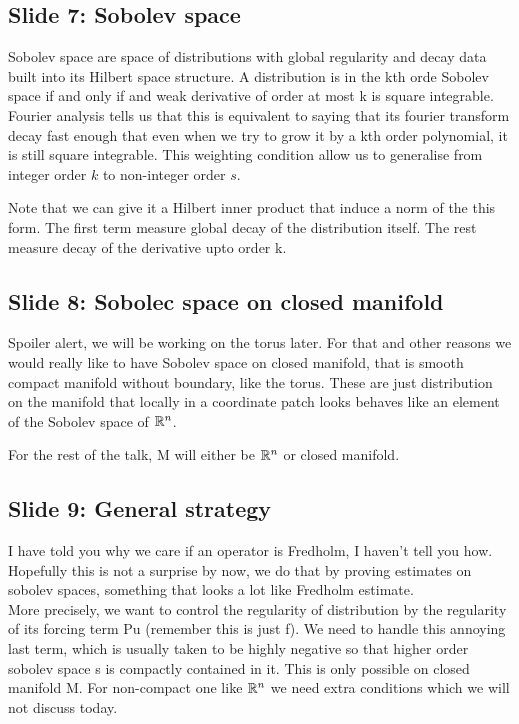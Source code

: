 \documentclass{article}
\begin{document}
\subsection{Slide 7: Sobolev space}
Sobolev space are space of distributions with global regularity and decay data built into its Hilbert space structure. A distribution is in the kth orde Sobolev space if and only if and weak derivative of order at most k is square integrable. Fourier analysis tells us that this is equivalent to saying that its fourier transform decay fast enough that even when we try to grow it by a kth order polynomial, it is still square integrable. This weighting condition allow us to generalise from integer order $k$ to non-integer order $s$. 

Note that we can give it a Hilbert inner product that induce a norm of the this form. The first term measure global decay of the distribution itself. The rest measure decay of the derivative upto order k. 


\subsection{Slide 8: Sobolec space on closed manifold}
Spoiler alert, we will be working on the torus later. For that and other reasons we would really like to have Sobolev space on closed manifold, that is smooth compact manifold without boundary, like the torus. These are just distribution on the manifold that locally in a coordinate patch looks behaves like an element of the Sobolev space of ${\mathbb R}^n$. 

For the rest of the talk, M will either be ${\mathbb R}^n$ or closed manifold. 

\subsection{Slide 9: General strategy}
I have told you why we care if an operator is Fredholm, I haven't tell you how. Hopefully this is not a surprise by now, we do that by proving estimates on sobolev spaces, something that looks a lot like Fredholm estimate. \\


More precisely, we want to control the regularity of distribution by the regularity of its forcing term Pu (remember this is just f). We need to handle this annoying last term, which is usually taken to be highly negative so that higher order sobolev space s is compactly contained in it. This is only possible on closed manifold M. For non-compact one like ${\mathbb R}^n$ we need extra conditions which we will not discuss today. \\
\end{document}

